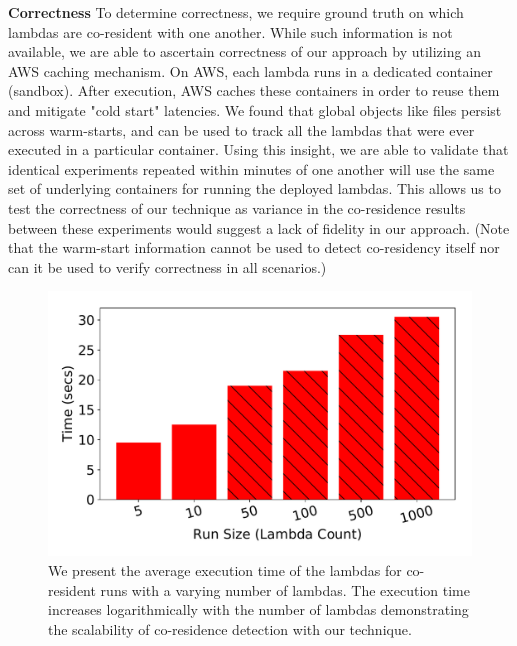 \textbf{Correctness} 
To determine correctness, we require ground truth on which lambdas are
co-resident with one another. While such information is not available, we are
able to ascertain correctness of our approach by utilizing an AWS caching
mechanism. On AWS, each lambda runs in a dedicated container (sandbox).  After
execution, AWS caches these containers in order to reuse
them~\cite{awscontainerreuse} and mitigate "cold start" latencies. 
We found that global objects like files persist across warm-starts,
and can be used to track all the lambdas that were
ever executed in a particular container. Using this insight, we are able to 
validate that
identical experiments repeated within minutes of one another will use the same
set of underlying containers for running the deployed lambdas. This allows us 
to test the correctness of our technique as variance in the co-residence 
results between these experiments would suggest a lack of fidelity in our approach. 
(Note that the warm-start information cannot be used to detect co-residency itself 
nor can it be used to verify correctness in all scenarios.)


\begin{figure}[!t]
  \includegraphics[width=.99\linewidth]{fig/runtimes.pdf}
  \caption{We present the average execution time of the lambdas for co-resident
  runs with a varying number of lambdas. The execution time increases
  logarithmically with the number of lambdas demonstrating the scalability of
  co-residence detection with our technique.
\label{fig:runtimes}}
\end{figure}


